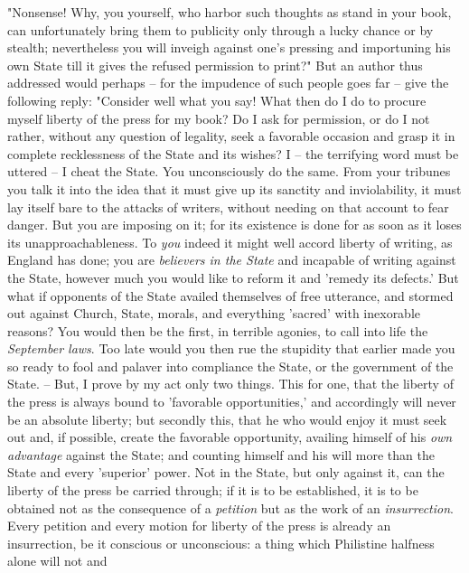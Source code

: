 "{}Nonsense! Why, you yourself, who harbor such thoughts as stand in your 
book, can unfortunately bring them to publicity only through a lucky chance or 
by stealth; nevertheless you will inveigh against one's pressing and 
importuning his own State till it gives the refused permission to print?"{} 
But an author thus addressed would perhaps -- for the impudence of such people 
goes far -- give the following reply: "{}Consider well what you say! What then 
do I do to procure myself liberty of the press for my book? Do I ask for 
permission, or do I not rather, without any question of legality, seek a 
favorable occasion and grasp it in complete recklessness of the State and its 
wishes? I -- the terrifying word must be uttered -- I cheat the State. You 
unconsciously do the same. From your tribunes you talk it into the idea that 
it must give up its sanctity and inviolability, it must lay itself bare to the 
attacks of writers, without needing on that account to fear danger. But you 
are imposing on it; for its existence is done for as soon as it loses its 
unapproachableness. To \textit{you} indeed it might well accord liberty of 
writing, as England has done; you are \textit{believers in the State} and 
incapable of writing against the State, however much you would like to reform 
it and 'remedy its defects.' But what if opponents of the State availed 
themselves of free utterance, and stormed out against Church, State, morals, 
and everything 'sacred' with inexorable reasons? You would then be the first, 
in terrible agonies, to call into life the \textit{September laws}. Too late 
would you then rue the stupidity that earlier made you so ready to fool and 
palaver into compliance the State, or the government of the State. -- But, I 
prove by my act only two things. This for one, that the liberty of the press 
is always bound to 'favorable opportunities,' and accordingly will never be an 
absolute liberty; but secondly this, that he who would enjoy it must seek out 
and, if possible, create the favorable opportunity, availing himself of his 
\textit{own advantage} against the State; and counting himself and his will 
more than the State and every 'superior' power. Not in the State, but only 
against it, can the liberty of the press be carried through; if it is to be 
established, it is to be obtained not as the consequence of a 
\textit{petition} but as the work of an \textit{insurrection}. Every petition 
and every motion for liberty of the press is already an insurrection, be it 
conscious or unconscious: a thing which Philistine halfness alone will not and 
